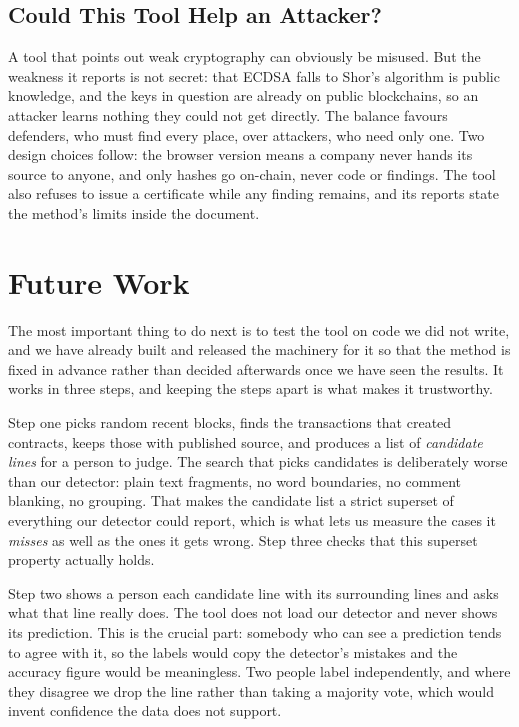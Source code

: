 \documentclass[runningheads]{llncs}
\begin{document}
\subsection{Could This Tool Help an Attacker?}

A tool that points out weak cryptography can obviously be misused. But the
weakness it reports is not secret: that ECDSA falls to Shor's algorithm is
public knowledge, and the keys in question are already on public blockchains, so
an attacker learns nothing they could not get directly. The balance favours
defenders, who must find every place, over attackers, who need only one. Two
design choices follow: the browser version means a company never hands its
source to anyone, and only hashes go on-chain, never code or findings. The tool
also refuses to issue a certificate while any finding remains, and its reports
state the method's limits inside the document.

\section{Future Work}
\label{sec:future}

The most important thing to do next is to test the tool on code we did not
write, and we have already built and released the machinery for it so that the
method is fixed in advance rather than decided afterwards once we have seen the
results. It works in three steps, and keeping the steps apart is what makes it
trustworthy.

Step one picks random recent blocks, finds the transactions that created
contracts, keeps those with published source, and produces a list of
\emph{candidate lines} for a person to judge. The search that picks candidates is
deliberately worse than our detector: plain text fragments, no word boundaries,
no comment blanking, no grouping. That makes the candidate list a strict
superset of everything our detector could report, which is what lets us measure
the cases it \emph{misses} as well as the ones it gets wrong. Step three checks
that this superset property actually holds.

Step two shows a person each candidate line with its surrounding lines and asks
what that line really does. The tool does not load our detector and never shows
its prediction. This is the crucial part: somebody who can see a prediction
tends to agree with it, so the labels would copy the detector's mistakes and the
accuracy figure would be meaningless. Two people label independently, and where
they disagree we drop the line rather than taking a majority vote, which would
invent confidence the data does not support.
\end{document}

